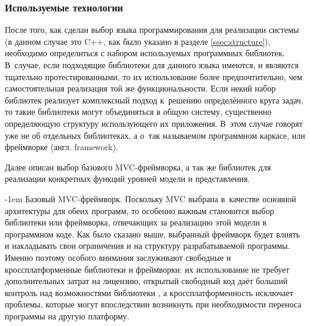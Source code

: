 \documentclass[a4paper, 14pt, titlepage]{extarticle}
\makeatletter
\newcommand{\eng}[1]{\foreignlanguage{english}{#1}}
\renewcommand{\paragraph}{%
    \@startsection{paragraph}{4}%
    {\parindent}{\z@}{-1em}%
    {\normalfont\normalsize\bfseries}%
  }
\makeatother
\begin{document}
  \subsubsection{Используемые технологии}\label{ssec:techno}

  После того, как сделан выбор языка программирования для реализации системы (в данном случае это
  C++, как было указано в разделе \ref{ssec:structure}), необходимо определиться с набором используемых
  программных библиотек. В~случае, если подходящие библиотеки для данного языка имеются, и являются тщательно
  протестированными, то их использование более предпочтительно, чем самостоятельная реализация той
  же функциональности. Если некий набор библиотек реализует комплексный подход к~решению
  определённого круга задач, то такие библиотеки могут объединяться в общую систему, существенно
  определяющую структуру использующего их приложения. В~этом случае говорят уже не об отдельных
  библиотеках, а о~так называемом программном каркасе, или фреймворке (англ. \eng{framework}).

  Далее описан выбор базового MVC-фреймворка, а так же библиотек для реализации
  конкретных функций уровней модели и представления.

  \paragraph{Базовый MVC-фреймворк.}
  Поскольку MVC выбрана в~качестве основной архитектуры для обеих программ, то особенно важным
  становится выбор библиотеки или фреймворка, отвечающих за реализацию этой модели в программном
  коде. Как было сказано выше, выбранный фреймворк будет влиять и накладывать свои ограничения и на
  структуру разрабатываемой программы. Именно поэтому особого внимания заслуживают свободные и
  кроссплатформенные библиотеки и фреймворки: их использование не требует дополнительных затрат на
  лицензию, открытый свободный код даёт больший контроль над возможностями библиотеки \cite{open-source},
  а кроссплатформенность исключает проблемы, которые могут впоследствии возникнуть при необходимости
  переноса программы на другую платформу.
\end{document}
